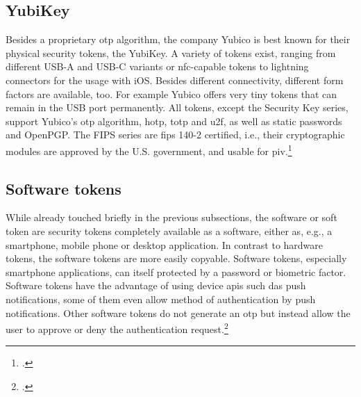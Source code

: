 \subsection{YubiKey}

Besides a proprietary \gls{otp} algorithm, the company Yubico is best known for their physical security tokens, the YubiKey. A variety of tokens exist, ranging from different USB-A and USB-C variants or \gls{nfc}-capable tokens to lightning connectors for the usage with iOS. Besides different connectivity, different form factors are available, too. For example Yubico offers very tiny tokens that can remain in the USB port permanently. All tokens, except the \frqq Security Key\flqq{} series, support Yubico's \gls{otp} algorithm, \gls{hotp}, \gls{totp} and \gls{u2f}, as well as static passwords and OpenPGP. The \frqq FIPS series\flqq{} are \gls{fips} 140-2 certified, i.e., their cryptographic modules are approved by the U.S. government, and usable for \gls{piv}.\footcites[See][716]{Vacca2017aa}[See][83]{Jacobs:2016:STA:2953926.2953927}[See][109]{Jacobs:2019}

\subsection{Software tokens}

While already touched briefly in the previous subsections, the software or soft token are security tokens completely available as a software, either as, e.g., a smartphone, mobile phone or desktop application. In contrast to hardware tokens, the software tokens are more easily copyable. Software tokens, especially smartphone applications, can itself protected by a password or biometric factor. Software tokens have the advantage of using device \glspl{api} such das push notifications, some of them even allow method of \frqq authentication by push notifications\flqq. Other software tokens do not generate an \gls{otp} but instead allow the user to approve or deny the authentication request.\footcites[See][717]{Vacca2017aa}[See][113]{vacca2013managing}[See][60]{Ulqinaku:2019:FPP:3317549.3323404}[See][222--223]{dasgupta2017multi}
